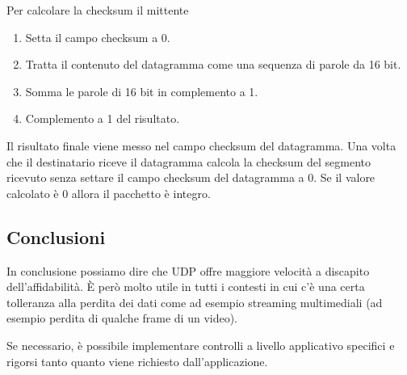 Per calcolare la checksum il mittente
\begin{enumerate}
	\item Setta il campo checksum a 0.
	\item Tratta il contenuto del datagramma come una sequenza di parole da 16 bit.
	\item Somma le parole di 16 bit in complemento a 1.
	\item Complemento a 1 del risultato.
\end{enumerate}
Il risultato finale viene messo nel campo checksum del datagramma. Una volta che il destinatario
riceve il datagramma calcola la checksum del segmento ricevuto senza settare il campo checksum del
datagramma a 0. Se il valore calcolato è 0 allora il pacchetto è integro.

\subsection{Conclusioni}
In conclusione possiamo dire che UDP offre maggiore velocità a discapito dell'affidabilità. \`E
però molto utile in tutti i contesti in cui c'è una certa tolleranza alla perdita dei dati come 
ad esempio streaming multimediali (ad esempio perdita di qualche frame di un video).

Se necessario, è possibile implementare controlli a livello applicativo specifici e rigorsi tanto
quanto viene richiesto dall'applicazione.
